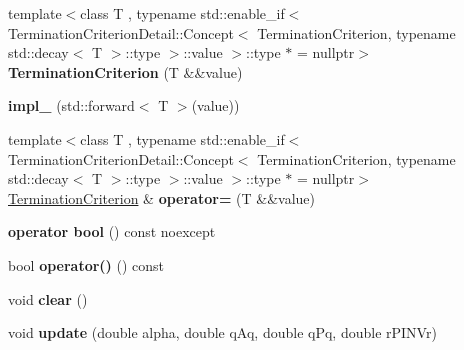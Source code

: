 \begin{DoxyCompactItemize}
\item 
\hypertarget{classSpacy_1_1CG_1_1TerminationCriterion_a802fa06abd50e597332969cbd7d39bc5}{{\footnotesize template$<$class T , typename std\-::enable\-\_\-if$<$ Termination\-Criterion\-Detail\-::\-Concept$<$ Termination\-Criterion, typename std\-::decay$<$ T $>$\-::type $>$\-::value $>$\-::type $\ast$  = nullptr$>$ }\\{\bfseries Termination\-Criterion} (T \&\&value)}\label{classSpacy_1_1CG_1_1TerminationCriterion_a802fa06abd50e597332969cbd7d39bc5}

\item 
\hypertarget{classSpacy_1_1CG_1_1TerminationCriterion_a7979d882d30902fbfcbbb9b0476fb39c}{{\bfseries impl\-\_\-} (std\-::forward$<$ T $>$(value))}\label{classSpacy_1_1CG_1_1TerminationCriterion_a7979d882d30902fbfcbbb9b0476fb39c}

\item 
\hypertarget{classSpacy_1_1CG_1_1TerminationCriterion_ac0f2c2ed8e6cb00861ae1131eb2eb3a2}{{\footnotesize template$<$class T , typename std\-::enable\-\_\-if$<$ Termination\-Criterion\-Detail\-::\-Concept$<$ Termination\-Criterion, typename std\-::decay$<$ T $>$\-::type $>$\-::value $>$\-::type $\ast$  = nullptr$>$ }\\\hyperlink{classSpacy_1_1CG_1_1TerminationCriterion}{Termination\-Criterion} \& {\bfseries operator=} (T \&\&value)}\label{classSpacy_1_1CG_1_1TerminationCriterion_ac0f2c2ed8e6cb00861ae1131eb2eb3a2}

\item 
\hypertarget{classSpacy_1_1CG_1_1TerminationCriterion_a527774f74e16fe94efa958e594c1be6d}{{\bfseries operator bool} () const noexcept}\label{classSpacy_1_1CG_1_1TerminationCriterion_a527774f74e16fe94efa958e594c1be6d}

\item 
\hypertarget{classSpacy_1_1CG_1_1TerminationCriterion_ab109eb287dd3622db54bbbdf0a55660a}{bool {\bfseries operator()} () const }\label{classSpacy_1_1CG_1_1TerminationCriterion_ab109eb287dd3622db54bbbdf0a55660a}

\item 
\hypertarget{classSpacy_1_1CG_1_1TerminationCriterion_a347651c14a38ce3bf1c92454aded97ab}{void {\bfseries clear} ()}\label{classSpacy_1_1CG_1_1TerminationCriterion_a347651c14a38ce3bf1c92454aded97ab}

\item 
\hypertarget{classSpacy_1_1CG_1_1TerminationCriterion_a4ef7ad43f594bab9b21f60e36697c516}{void {\bfseries update} (double alpha, double q\-Aq, double q\-Pq, double r\-P\-I\-N\-Vr)}\label{classSpacy_1_1CG_1_1TerminationCriterion_a4ef7ad43f594bab9b21f60e36697c516}


\end{DoxyCompactItemize}
